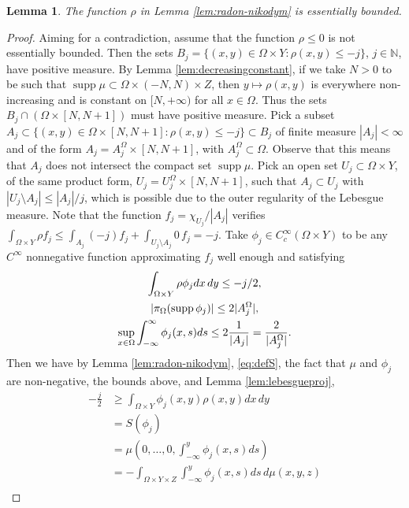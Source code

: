 \documentclass{article}
\newtheorem{lemma}[theorem]{Lemma}
\theoremstyle{definition}
\theoremstyle{remark}
\newcommand{\proj}{\pi}
\newcommand{\projX}{\proj_{\Omega}}
\begin{document}
\begin{lemma}\label{lem:boundedrange}
The function $\rho$ in Lemma \ref{lem:radon-nikodym} is essentially bounded.
\end{lemma}
\begin{proof}
 Aiming for a contradiction, assume that the function $\rho\leq 0$ is not essentially bounded. 
 Then the sets $B_j=\{(x,y)\in\Omega\times Y:\rho(x,y)\leq -j\}$, $j\in\mathbb N$, have positive measure. By Lemma \ref{lem:decreasingconstant}, if we take $N>0$ to be such that $\operatorname{supp}\mu\subset\Omega\times(-N,N)\times Z$, then $y\mapsto \rho(x,y)$ is everywhere non-increasing and is constant on $[N,+\infty)$ for all $x\in\Omega$. Thus the sets $B_j\cap(\Omega\times [N,N+1])$ must have positive measure.
 Pick a subset $A_j\subset \{(x,y)\in\Omega\times [N,N+1]:\rho(x,y)\leq -j\}\subset B_j$ of finite measure $|A_j|<\infty$ and of the form $A_j=A_j^\Omega\times [N,N+1]$, with $A_j^\Omega\subset\Omega$. Observe that this means that $A_j$ does not intersect the compact set $\operatorname{supp}\mu$. Pick an open set $U_j\subset\Omega\times Y$, of the same product form, $U_j=U^\Omega_j\times[N,N+1]$, such that $A_j\subset U_j$ with $|U_j\setminus A_j|\leq |A_j|/j$, which is possible due to the outer regularity of {the} Lebesgue measure. Note that the function $f_j=\chi_{U_j}/|A_j|$ verifies $\int_{\Omega\times Y} \rho f_j\leq \int_{A_j} (-j) f_j+\int_{U_j\setminus A_j}0\,f_j= -j$. Take $\phi_j\in C^\infty_c(\Omega\times Y)$  to be any $C^\infty$ nonnegative function approximating $f_j$ well enough and satisfying
%
 \begin{gather}
 \label{eq:contradiction}
 \int_{\Omega\times Y}\rho\phi_j dx\,dy\leq -j/2, \\
 \notag |\projX{}(\operatorname{supp}\phi_j)|\leq 2|A^\Omega_j|, \\
 \notag \sup_{x\in\Omega}\int_{-\infty}^\infty\phi_j(x,s)ds\leq 2\frac{1}{|A_j|}=\frac2{|A^\Omega_j|}.%
 \end{gather}
 Then we have by Lemma \ref{lem:radon-nikodym}, \eqref{eq:defS}, the fact that $\mu$ and $\phi_j$ are non-negative, the bounds above, and Lemma \ref{lem:lebesgueproj},
 \begin{align*}
    -\frac j2&\geq\int_{\Omega\times Y}\phi_j(x,y)\rho(x,y)dx\,dy\\
    &=S(\phi_j)\\
    &=\mu\left(0,\dots,0,\int_{-\infty}^y\phi_j(x,s)ds\right)\\
    &=-\int_{\Omega\times Y\times Z}\int_{-\infty}^y\phi_j(x,s)ds\, d\mu(x,y,z)\\

\end{align*}
\end{proof}
\end{document}
